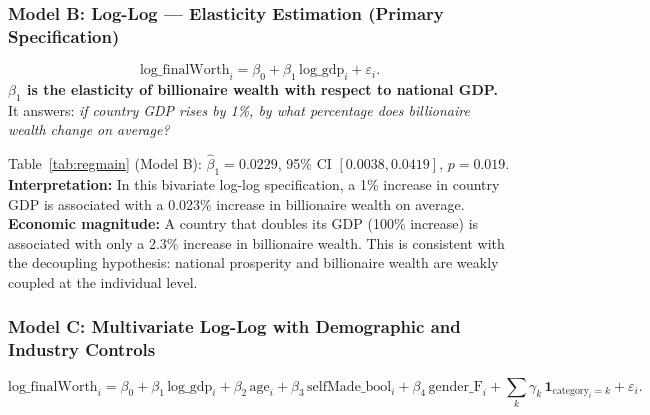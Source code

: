 \documentclass[a4paper,10pt]{article}
\begin{document}
\bigskip

\subsubsection{Model B: Log-Log --- Elasticity Estimation (Primary Specification)}
\[
\mathrm{log\_finalWorth}_i = \beta_0 + \beta_1\,\mathrm{log\_gdp}_i + \varepsilon_i.
\]
\textbf{$\beta_1$ is the elasticity of billionaire wealth with respect to national GDP.} It answers: \emph{if country GDP rises by 1\%, by what percentage does billionaire wealth change on average?}

Table~\ref{tab:regmain} (Model B): $\hat\beta_1 = 0.0229$, 95\% CI $[0.0038, 0.0419]$, $p = 0.019$.
\textbf{Interpretation:} In this bivariate log-log specification, a 1\% increase in country GDP is associated with a 0.023\% increase in billionaire wealth on average.
\textbf{Economic magnitude:} A country that doubles its GDP (100\% increase) is associated with only a 2.3\% increase in billionaire wealth. This is consistent with the decoupling hypothesis: national prosperity and billionaire wealth are weakly coupled at the individual level.

\bigskip

\subsubsection{Model C: Multivariate Log-Log with Demographic and Industry Controls}
\[
\mathrm{log\_finalWorth}_i = \beta_0 + \beta_1\,\mathrm{log\_gdp}_i + \beta_2\,\mathrm{age}_i + \beta_3\,\mathrm{selfMade\_bool}_i + \beta_4\,\mathrm{gender\_F}_i + \sum_{k}\gamma_k\,\mathbf{1}_{\mathrm{category}_i=k} + \varepsilon_i.
\]
\end{document}
